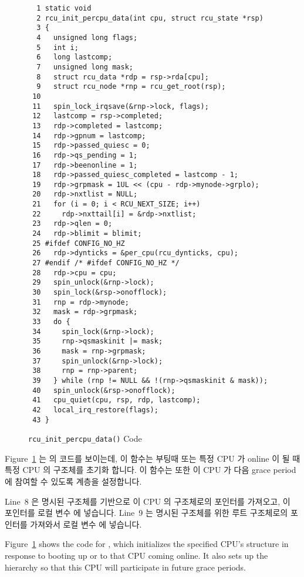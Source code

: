 \begin{figure}[tbp]
{ \scriptsize
\begin{verbatim}
  1 static void
  2 rcu_init_percpu_data(int cpu, struct rcu_state *rsp)
  3 {
  4   unsigned long flags;
  5   int i;
  6   long lastcomp;
  7   unsigned long mask;
  8   struct rcu_data *rdp = rsp->rda[cpu];
  9   struct rcu_node *rnp = rcu_get_root(rsp);
 10
 11   spin_lock_irqsave(&rnp->lock, flags);
 12   lastcomp = rsp->completed;
 13   rdp->completed = lastcomp;
 14   rdp->gpnum = lastcomp;
 15   rdp->passed_quiesc = 0;
 16   rdp->qs_pending = 1;
 17   rdp->beenonline = 1;
 18   rdp->passed_quiesc_completed = lastcomp - 1;
 19   rdp->grpmask = 1UL << (cpu - rdp->mynode->grplo);
 20   rdp->nxtlist = NULL;
 21   for (i = 0; i < RCU_NEXT_SIZE; i++)
 22     rdp->nxttail[i] = &rdp->nxtlist;
 23   rdp->qlen = 0;
 24   rdp->blimit = blimit;
 25 #ifdef CONFIG_NO_HZ
 26   rdp->dynticks = &per_cpu(rcu_dynticks, cpu);
 27 #endif /* #ifdef CONFIG_NO_HZ */
 28   rdp->cpu = cpu;
 29   spin_unlock(&rnp->lock);
 30   spin_lock(&rsp->onofflock);
 31   rnp = rdp->mynode;
 32   mask = rdp->grpmask;
 33   do {
 34     spin_lock(&rnp->lock);
 35     rnp->qsmaskinit |= mask;
 36     mask = rnp->grpmask;
 37     spin_unlock(&rnp->lock);
 38     rnp = rnp->parent;
 39   } while (rnp != NULL && !(rnp->qsmaskinit & mask));
 40   spin_unlock(&rsp->onofflock);
 41   cpu_quiet(cpu, rsp, rdp, lastcomp);
 42   local_irq_restore(flags);
 43 }
\end{verbatim}
}
\caption{{\tt rcu\_init\_percpu\_data()} Code}
\label{fig:app:rcuimpl:rcutreewt:Code for rcu-init-percpu-data}
\end{figure}

Figure~\ref{fig:app:rcuimpl:rcutreewt:Code for rcu-init-percpu-data}
는  의 코드를 보이는데, 이 함수는 부팅때 또는 특정
CPU 가 online 이 될 때 특정 CPU 의  구조체를 초기화 합니다.
이 함수는 또한 이 CPU 가 다음 grace period 에 참여할 수 있도록 
계층을 설정합니다.

Line~8 은 명시된  구조체를 기반으로 이 CPU 의 
구조체로의 포인터를 가져오고, 이 포인터를 로컬 변수  에 넣습니다.
Line~9 는 명시된  구조체를 위한 루트  구조체로의
포인터를 가져와서 로컬 변수  에 넣습니다.
\iffalse

Figure~\ref{fig:app:rcuimpl:rcutreewt:Code for rcu-init-percpu-data}
shows the code for , which initializes
the specified CPU's  structure in response to booting
up or to that CPU coming online.
It also sets up the  hierarchy so that this CPU will
participate in future grace periods.

